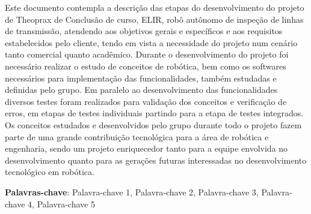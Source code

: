 \begin{thesisresumo}
Este documento contempla a descrição das etapas do desenvolvimento do projeto de Theoprax de Conclusão de curso, ELIR, robô autônomo de inspeção de linhas de transmissão, atendendo aos objetivos gerais e específicos e aos requisitos estabelecidos pelo cliente, tendo em vista a necessidade do projeto num cenário tanto comercial quanto acadêmico. Durante o desenvolvimento do projeto foi necessário realizar o estudo de conceitos de robótica, bem como os softwares necessários para implementação das funcionalidades, também estudadas e definidas pelo grupo. Em paralelo ao desenvolvimento das funcionalidades diversos testes foram realizados para validação dos conceitos e verificação de erros, em etapas de testes individuais partindo para a etapa de testes integrados. Os conceitos estudados e desenvolvidos pelo grupo durante todo o projeto fazem parte de uma grande contribuição tecnológica para a área de robótica e engenharia, sendo um projeto enriquecedor tanto para a equipe envolvida no desenvolvimento quanto para as gerações futuras interessadas no desenvolvimento tecnológico em robótica.   





\textbf{Palavras-chave}: Palavra-chave 1, Palavra-chave 2, Palavra-chave 3, Palavra-chave 4, Palavra-chave 5

\end{thesisresumo}
